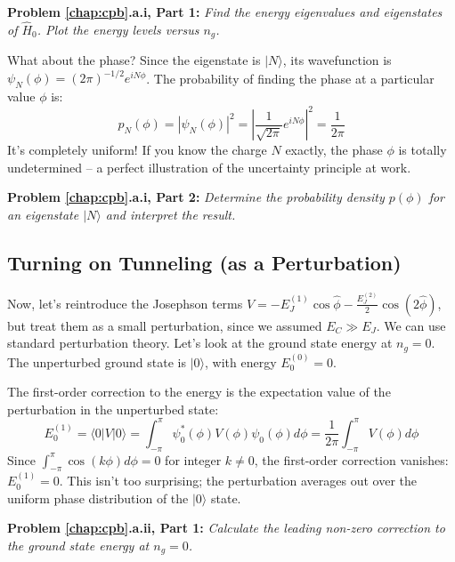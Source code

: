 \documentclass{book}
\newenvironment{problem}[1][Problem]{\par\medskip\noindent\textbf{#1:}\em}{\par\medskip}
\begin{document}
\begin{problem}[Problem \ref{chap:cpb}.a.i, Part 1] 
Find the energy eigenvalues and eigenstates of \(\hat{H}_0\). Plot the energy levels versus \(n_g\).
\end{problem}

What about the phase? Since the eigenstate is \(|N\rangle\), its wavefunction is \(\psi_N(\phi) = (2\pi)^{-1/2} e^{i N \phi}\). The probability of finding the phase at a particular value \(\phi\) is:
\begin{equation}
p_N(\phi) = |\psi_N(\phi)|^2 = \left|\frac{1}{\sqrt{2\pi}} e^{i N \phi}\right|^2 = \frac{1}{2\pi}
\end{equation}
It's completely uniform! If you know the charge \(N\) exactly, the phase \(\phi\) is totally undetermined – a perfect illustration of the uncertainty principle at work.

\begin{problem}[Problem \ref{chap:cpb}.a.i, Part 2] 
Determine the probability density \(p(\phi)\) for an eigenstate \(|N\rangle\) and interpret the result.
\end{problem}

\subsection{Turning on Tunneling (as a Perturbation)}
\label{subsec:charging_pert}

Now, let's reintroduce the Josephson terms \(V = -E_J^{(1)} \cos \hat{\phi} - \frac{E_J^{(2)}}{2} \cos (2 \hat{\phi})\), but treat them as a small perturbation, since we assumed \(E_C \gg E_J\). We can use standard perturbation theory. Let's look at the ground state energy at \(n_g = 0\). The unperturbed ground state is \(|0\rangle\), with energy \(E_0^{(0)} = 0\).

The first-order correction to the energy is the expectation value of the perturbation in the unperturbed state:
\begin{equation}
E_0^{(1)} = \langle 0 | V | 0 \rangle = \int_{-\pi}^{\pi} \psi_0^*(\phi) V(\phi) \psi_0(\phi) d\phi = \frac{1}{2\pi} \int_{-\pi}^\pi V(\phi) d\phi
\end{equation}
Since \(\int_{-\pi}^{\pi} \cos(k\phi) d\phi = 0\) for integer \(k \neq 0\), the first-order correction vanishes: \(E_0^{(1)} = 0\). This isn't too surprising; the perturbation averages out over the uniform phase distribution of the \(|0\rangle\) state.

\begin{problem}[Problem \ref{chap:cpb}.a.ii, Part 1] 
Calculate the leading non-zero correction to the ground state energy at \(n_g = 0\).
\end{problem}
\end{document}
